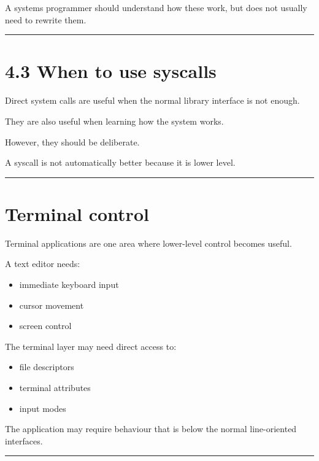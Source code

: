 \documentclass[
  oneside,
  openany]{book}
\providecommand{\tightlist}{%
  \setlength{\itemsep}{0pt}\setlength{\parskip}{0pt}}
\begin{document}
A systems programmer should understand how these work, but does not
usually need to rewrite them.

\begin{center}\rule{0.5\linewidth}{0.5pt}\end{center}

\hypertarget{when-to-use-syscalls}{%
\section{4.3 When to use syscalls}\label{when-to-use-syscalls}}

Direct system calls are useful when the normal library interface is not
enough.

They are also useful when learning how the system works.

However, they should be deliberate.

A syscall is not automatically better because it is lower level.

\begin{center}\rule{0.5\linewidth}{0.5pt}\end{center}

\hypertarget{terminal-control}{%
\section{Terminal control}\label{terminal-control}}

Terminal applications are one area where lower-level control becomes
useful.

A text editor needs:

\begin{itemize}
\tightlist
\item
  immediate keyboard input
\item
  cursor movement
\item
  screen control
\end{itemize}

The terminal layer may need direct access to:

\begin{itemize}
\tightlist
\item
  file descriptors
\item
  terminal attributes
\item
  input modes
\end{itemize}

The application may require behaviour that is below the normal
line-oriented interfaces.

\begin{center}\rule{0.5\linewidth}{0.5pt}\end{center}
\end{document}
